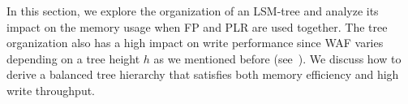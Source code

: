In this section, we explore the organization of an LSM-tree and analyze
its impact on the memory usage when FP and PLR are used together.  
The tree organization also has a high impact on
write performance since WAF varies depending on a tree height $h$
as we mentioned before (see~).  
We discuss how to derive a balanced tree hierarchy that
satisfies both memory efficiency and high write throughput.

